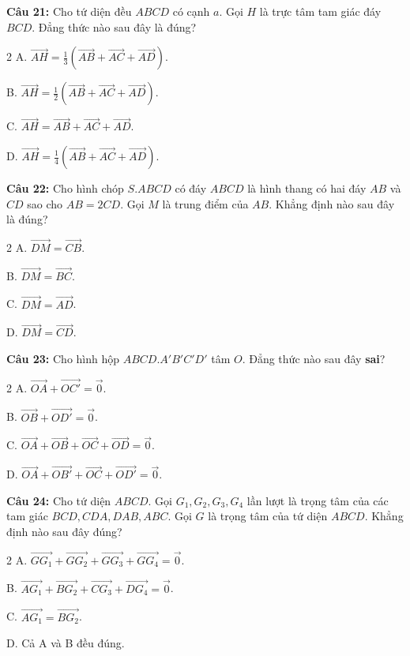 \documentclass[12pt]{article}
\begin{document}
	\vspace{0.2cm}
	\noindent\textbf{Câu 21:} Cho tứ diện đều $ABCD$ có cạnh $a$. Gọi $H$ là trực tâm tam giác đáy $BCD$. Đẳng thức nào sau đây là đúng?
	\begin{multicols}{2}
		A. $\overrightarrow{AH} = \frac{1}{3}(\overrightarrow{AB} + \overrightarrow{AC} + \overrightarrow{AD})$. \par
		B. $\overrightarrow{AH} = \frac{1}{2}(\overrightarrow{AB} + \overrightarrow{AC} + \overrightarrow{AD})$. \par
		C. $\overrightarrow{AH} = \overrightarrow{AB} + \overrightarrow{AC} + \overrightarrow{AD}$. \par
		D. $\overrightarrow{AH} = \frac{1}{4}(\overrightarrow{AB} + \overrightarrow{AC} + \overrightarrow{AD})$.
	\end{multicols}
	
	\vspace{0.2cm}
	\noindent\textbf{Câu 22:} Cho hình chóp $S.ABCD$ có đáy $ABCD$ là hình thang có hai đáy $AB$ và $CD$ sao cho $AB = 2CD$. Gọi $M$ là trung điểm của $AB$. Khẳng định nào sau đây là đúng?
	\begin{multicols}{2}
		A. $\overrightarrow{DM} = \overrightarrow{CB}$. \par
		B. $\overrightarrow{DM} = \overrightarrow{BC}$. \par
		C. $\overrightarrow{DM} = \overrightarrow{AD}$. \par
		D. $\overrightarrow{DM} = \overrightarrow{CD}$.
	\end{multicols}
	
	\vspace{0.2cm}
	\noindent\textbf{Câu 23:} Cho hình hộp $ABCD.A'B'C'D'$ tâm $O$. Đẳng thức nào sau đây \textbf{sai}?
	\begin{multicols}{2}
		A. $\overrightarrow{OA} + \overrightarrow{OC'} = \vec{0}$. \par
		B. $\overrightarrow{OB} + \overrightarrow{OD'} = \vec{0}$. \par
		C. $\overrightarrow{OA} + \overrightarrow{OB} + \overrightarrow{OC} + \overrightarrow{OD} = \vec{0}$. \par
		D. $\overrightarrow{OA} + \overrightarrow{OB'} + \overrightarrow{OC} + \overrightarrow{OD'} = \vec{0}$.
	\end{multicols}
	
	\vspace{0.2cm}
	\noindent\textbf{Câu 24:} Cho tứ diện $ABCD$. Gọi $G_1, G_2, G_3, G_4$ lần lượt là trọng tâm của các tam giác $BCD, CDA, DAB, ABC$. Gọi $G$ là trọng tâm của tứ diện $ABCD$. Khẳng định nào sau đây đúng?
	\begin{multicols}{2}
		A. $\overrightarrow{GG_1} + \overrightarrow{GG_2} + \overrightarrow{GG_3} + \overrightarrow{GG_4} = \vec{0}$. \par
		B. $\overrightarrow{AG_1} + \overrightarrow{BG_2} + \overrightarrow{CG_3} + \overrightarrow{DG_4} = \vec{0}$. \par
		C. $\overrightarrow{AG_1} = \overrightarrow{BG_2}$. \par
		D. Cả A và B đều đúng.
	\end{multicols}
	
\end{document}
